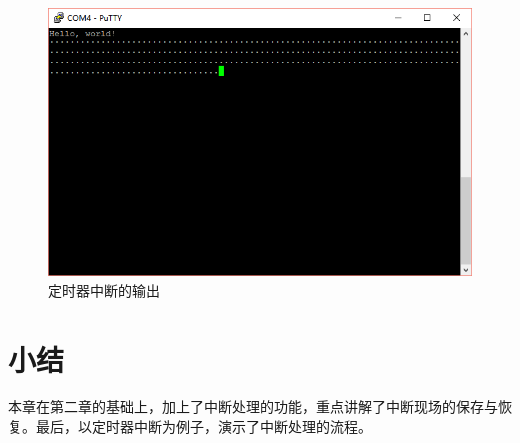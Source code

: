 \documentclass[main.tex]{subfiles}
\begin{document}
\begin{CJK*}{UTF8}{song}
\begin{figure}[htp]
\centering
\includegraphics[scale=0.5]{figures/3-6.png}
\caption{定时器中断的输出}
\label{figure:3-6}
\end{figure}

\section{小结}
本章在第二章的基础上，加上了中断处理的功能，重点讲解了中断现场的保存与恢复。最后，以定时器中断为例子，演示了中断处理的流程。

\clearpage
\ifxetex\else\end{CJK*}\fi
\end{document}
